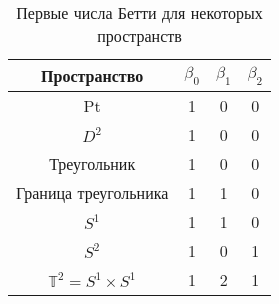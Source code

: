 \begin{center}
	\begin{table}[!htbp]
		\centering
		\begin{tabular}{ |c|c c c| }
			\hline
			Пространство & $\beta_0$ & $\beta_1$ & $\beta_2$ \\ 
			\hline
			Pt & 1 & 0 & 0 \\ 
			$D^2$ & 1 & 0 & 0 \\ 
			Треугольник & 1 & 0 & 0 \\
			Граница треугольника & 1 & 1 & 0 \\
			$S^1$ & 1 & 1 & 0 \\
			$S^2$ & 1 & 0 & 1 \\
			$\mathbb{T}^2 = S^1 \times S^1$ & 1 & 2 & 1 \\
			\hline
		\end{tabular}
		\caption{Первые числа Бетти для некоторых пространств}
		\label{tabl:betti}
	\end{table}
\end{center}
